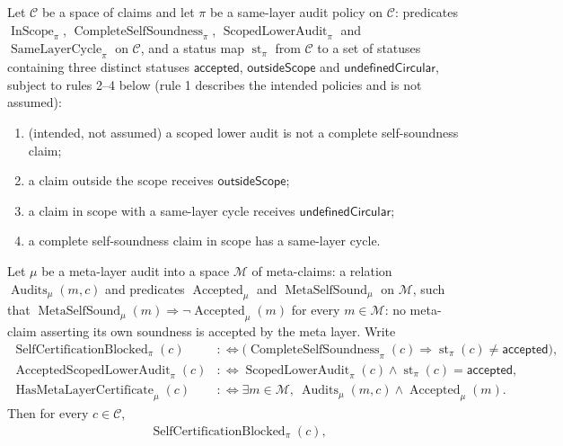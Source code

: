 \begin{theorem}\label{thm:F21}
Let \(\mathcal C\) be a space of claims and let \(\pi\) be a same-layer
audit policy on \(\mathcal C\): predicates
\(\operatorname{InScope}_{\pi}\),
\(\operatorname{CompleteSelfSoundness}_{\pi}\),
\(\operatorname{ScopedLowerAudit}_{\pi}\) and
\(\operatorname{SameLayerCycle}_{\pi}\) on \(\mathcal C\), and a status
map \(\operatorname{st}_{\pi}\) from \(\mathcal C\) to a set of statuses
containing three distinct statuses \(\mathsf{accepted}\),
\(\mathsf{outsideScope}\) and \(\mathsf{undefinedCircular}\), subject to rules 2--4 below (rule 1 describes the intended policies and is not assumed):
\begin{enumerate}
\item (intended, not assumed) a scoped lower audit is not a complete self-soundness claim;
\item a claim outside the scope receives \(\mathsf{outsideScope}\);
\item a claim in scope with a same-layer cycle receives
  \(\mathsf{undefinedCircular}\);
\item a complete self-soundness claim in scope has a same-layer cycle.
\end{enumerate}
Let \(\mu\) be a meta-layer audit into a space \(\mathcal M\) of
meta-claims: a relation \(\operatorname{Audits}_{\mu}(m,c)\) and
predicates \(\operatorname{Accepted}_{\mu}\) and
\(\operatorname{MetaSelfSound}_{\mu}\) on \(\mathcal M\), such that \(\operatorname{MetaSelfSound}_{\mu}(m)\Rightarrow\neg\operatorname{Accepted}_{\mu}(m)\) for every \(m\in\mathcal M\): no
meta-claim asserting its own soundness is accepted by the meta layer.
Write
\begin{align*}
  \operatorname{SelfCertificationBlocked}_{\pi}(c)
  &:\iff
  \bigl(\operatorname{CompleteSelfSoundness}_{\pi}(c)
    \Rightarrow \operatorname{st}_{\pi}(c)\ne\mathsf{accepted}\bigr),\\
  \operatorname{AcceptedScopedLowerAudit}_{\pi}(c)
  &:\iff
  \operatorname{ScopedLowerAudit}_{\pi}(c)
    \wedge\operatorname{st}_{\pi}(c)=\mathsf{accepted},\\
  \operatorname{HasMetaLayerCertificate}_{\mu}(c)
  &:\iff
  \exists m\in\mathcal M,\
    \operatorname{Audits}_{\mu}(m,c)\wedge\operatorname{Accepted}_{\mu}(m).
\end{align*}
Then for every \(c\in\mathcal C\),
\begin{align*}
  &\operatorname{SelfCertificationBlocked}_{\pi}(c),\\

\end{align*}
\end{theorem}
